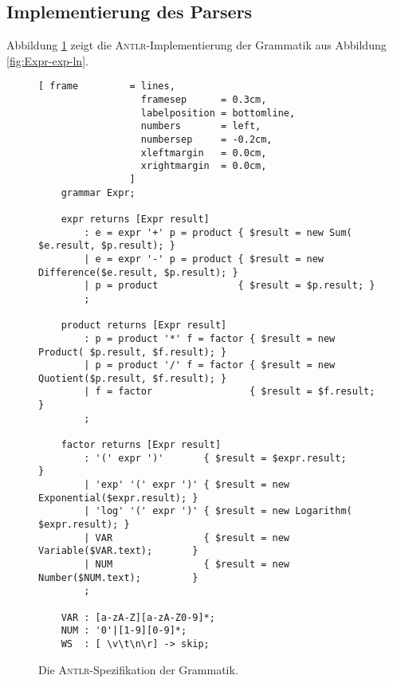 \subsection{Implementierung des Parsers}
Abbildung \ref{fig:grammatik.g} zeigt die \textsc{Antlr}-Implementierung der Grammatik
aus Abbildung \ref{fig:Expr-exp-ln}.  

\begin{figure}[!ht]
\centering
\begin{Verbatim}[ frame         = lines, 
                  framesep      = 0.3cm, 
                  labelposition = bottomline,
                  numbers       = left,
                  numbersep     = -0.2cm,
                  xleftmargin   = 0.0cm,
                  xrightmargin  = 0.0cm,
                ]
    grammar Expr;
    
    expr returns [Expr result]
        : e = expr '+' p = product { $result = new Sum(       $e.result, $p.result); }
        | e = expr '-' p = product { $result = new Difference($e.result, $p.result); }
        | p = product              { $result = $p.result; }    
        ;
    
    product returns [Expr result]
        : p = product '*' f = factor { $result = new Product( $p.result, $f.result); }
        | p = product '/' f = factor { $result = new Quotient($p.result, $f.result); }
        | f = factor                 { $result = $f.result; }
        ;
    
    factor returns [Expr result]
        : '(' expr ')'       { $result = $expr.result;                  }
        | 'exp' '(' expr ')' { $result = new Exponential($expr.result); }
        | 'log' '(' expr ')' { $result = new Logarithm(  $expr.result); }
        | VAR                { $result = new Variable($VAR.text);       }
        | NUM                { $result = new Number($NUM.text);         }
        ;
    
    VAR : [a-zA-Z][a-zA-Z0-9]*;
    NUM : '0'|[1-9][0-9]*;
    WS  : [ \v\t\n\r] -> skip; 
\end{Verbatim}
\vspace*{-0.3cm}
\caption{Die \textsc{Antlr}-Spezifikation der Grammatik.}
\label{fig:grammatik.g}
\end{figure}

